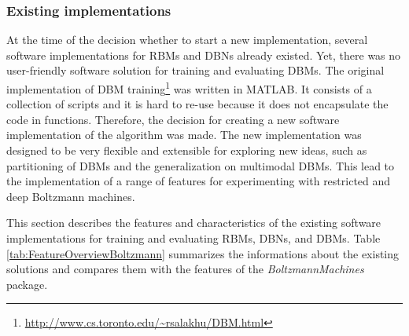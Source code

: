 \documentclass[12pt]{article}
\newcommand{\apkg}[1]{\emph{#1}}
\begin{document}
\subsubsection{Existing implementations}

At the time of the decision whether to start a new implementation, several software implementations for RBMs and DBNs already existed.
Yet, there was no user-friendly software solution for training and evaluating DBMs.
The original implementation of DBM training\footnote{\url{http://www.cs.toronto.edu/~rsalakhu/DBM.html}} was written in MATLAB.
It consists of a collection of scripts and it is hard to re-use because it does not encapsulate the code in functions.
Therefore, the decision for creating a new software implementation of the algorithm was made.
The new implementation was designed to be very flexible and extensible for exploring new ideas, such as partitioning of DBMs and the generalization on multimodal DBMs.
This lead to the implementation of a range of features for experimenting with restricted and deep Boltzmann machines.

This section describes the features and characteristics of the existing software implementations for training and evaluating RBMs, DBNs, and DBMs.
Table \ref{tab:FeatureOverviewBoltzmann} summarizes the informations about the existing solutions and compares them with the features of the \apkg{BoltzmannMachines} package.
\end{document}
